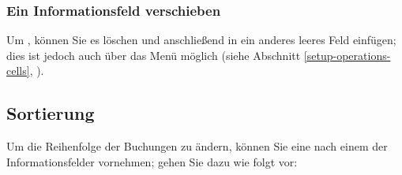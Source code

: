 \subsubsection{Ein Informationsfeld verschieben\label{transactions-list-fields-move}}


Um , können Sie es löschen und anschließend in ein anderes leeres Feld einfügen; dies ist jedoch auch über das Menü  möglich (siehe Abschnitt \vref{setup-operations-cells}, ).


\subsection{Sortierung\label{transactions-list-sorts}}

Um die Reihenfolge der Buchungen zu ändern, können Sie eine  nach einem der Informationsfelder vornehmen; gehen Sie dazu wie folgt vor:


